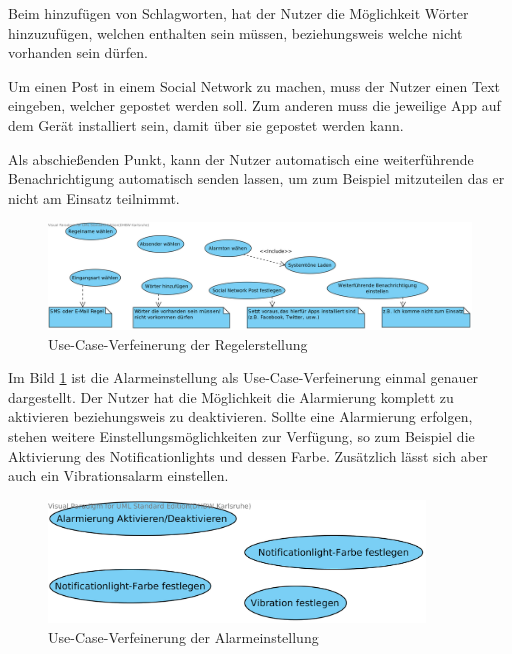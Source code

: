 Beim hinzuf\"ugen von Schlagworten, hat der Nutzer die M\"oglichkeit W\"orter hinzuzuf\"ugen, welchen enthalten sein m\"ussen, beziehungsweis welche nicht vorhanden sein d\"urfen. 

Um einen Post in einem Social Network zu machen, muss der Nutzer einen Text eingeben, welcher gepostet werden soll. Zum anderen muss die jeweilige App auf dem Ger\"at installiert sein, damit \"uber sie gepostet werden kann.

Als abschie\ss{}enden Punkt, kann der Nutzer automatisch eine weiterf\"uhrende Benachrichtigung automatisch senden lassen, um zum Beispiel mitzuteilen das er nicht am Einsatz teilnimmt.
\begin{figure}[!ht]
\centering
\includegraphics[width=16cm]{Bilder/UseCaseRegelerstellung.png}
\caption{Use-Case-Verfeinerung der Regelerstellung}
\label{Regelerstellung Use Case}
\centering
\end{figure}

\FloatBarrier
Im Bild \ref{Regelerstellung Use Case} ist die Alarmeinstellung als Use-Case-Verfeinerung einmal genauer dargestellt. Der Nutzer hat die M\"oglichkeit die Alarmierung komplett zu aktivieren beziehungsweis zu deaktivieren. Sollte eine Alarmierung erfolgen, stehen weitere Einstellungsm\"oglichkeiten zur Verf\"ugung, so zum Beispiel die Aktivierung des Notificationlights und dessen Farbe. Zus\"atzlich l\"asst sich aber auch ein Vibrationsalarm einstellen.
\begin{figure}[!ht]
\centering
\includegraphics[width=10cm]{Bilder/UseCaseAlarmeinstellung.png}
\caption{Use-Case-Verfeinerung der Alarmeinstellung}
\label{Alarmeinstellung Use Case}
\centering
\end{figure}

